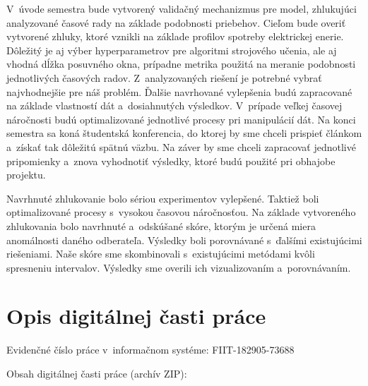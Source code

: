 \documentclass[a4paper,twoside,slovak,12pt,appendix]{article}
\begin{document}
\begin{appendices}
\begin{table}[!h]
\begin{tabular}{||l|p{}||}
    \hline
  \end{tabular}
\end{table}
\noindent
V~úvode semestra bude vytvorený validačný mechanizmus pre model, zhlukujúci
analyzované časové rady na základe podobnosti priebehov. Cieľom bude overiť
vytvorené zhluky, ktoré vznikli na základe profilov spotreby elektrickej enerie.
Dôležitý je aj výber hyperparametrov pre algoritmi strojového učenia, ale aj
vhodná dĺžka posuvného okna, prípadne metrika použitá na meranie podobnosti
jednotlivých časových radov. Z~analyzovaných riešení je potrebné vybrať
najvhodnejšie pre náš problém. Ďalšie navrhované vylepšenia budú zapracované na
základe vlastností dát a~dosiahnutých výsledkov. V~prípade veľkej časovej
náročnosti budú optimalizované jednotlivé procesy pri manipulácií dát. Na konci
semestra sa koná študentská konferencia, do ktorej by sme chceli prispieť
článkom a~získať tak dôležitú spätnú väzbu. Na záver by sme chceli zapracovať
jednotlivé pripomienky a~znova vyhodnotiť výsledky, ktoré budú použité pri
obhajobe projektu.

Navrhnuté zhlukovanie bolo sériou experimentov vylepšené. Taktiež boli
optimalizované procesy s~vysokou časovou náročnosťou. Na základe vytvoreného
zhlukovania bolo navrhnuté a~odskúšané skóre, ktorým je určená miera anomálnosti
daného odberateľa. Výsledky boli porovnávané s~ďalšími existujúcimi riešeniami.
Naše skóre sme skombinovali s~existujúcimi metódami kvôli spresneniu intervalov.
Výsledky sme overili ich vizualizovaním a~porovnávaním.

\section{Opis digitálnej časti práce}
Evidenčné číslo práce v~informačnom systéme: FIIT-182905-73688

Obsah digitálnej časti práce (archív ZIP):


\end{appendices}
\end{document}
